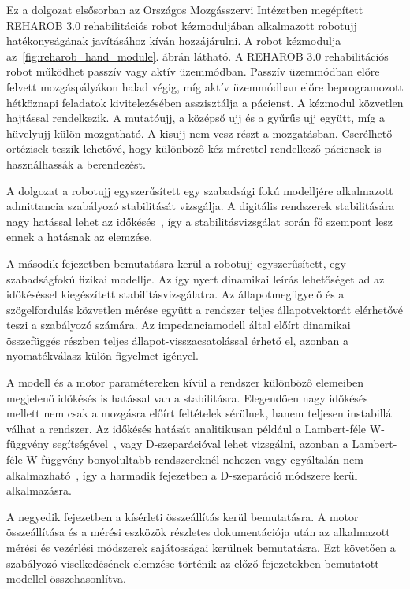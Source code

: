 Ez a dolgozat elsősorban az Országos Mozgásszervi Intézetben megépített REHAROB 3.0 
rehabilitációs robot kézmoduljában alkalmazott robotujj hatékonyságának javításához kíván hozzájárulni.
A robot kézmodulja az~\ref{fig:reharob_hand_module}. ábrán látható.
A REHAROB 3.0 rehabilitációs robot működhet passzív vagy aktív üzemmódban. Passzív üzemmódban előre felvett 
mozgáspályákon halad végig, míg aktív üzemmódban előre beprogramozott hétköznapi feladatok 
kivitelezésében asszisztálja a pácienst. A kézmodul közvetlen hajtással rendelkezik. A mutatóujj, a középső ujj és a
gyűrűs ujj együtt, míg a hüvelyujj külön mozgatható. A kisujj nem vesz részt a mozgatásban. Cserélhető ortézisek 
teszik lehetővé, hogy különböző kéz mérettel rendelkező páciensek is használhassák a berendezést.


A dolgozat a robotujj egyszerűsített egy szabadsági fokú modelljére alkalmazott admittancia szabályozó stabilitását vizsgálja.
A digitális rendszerek stabilitására nagy hatással lehet az időkésés~\citep{stepan1989retarded,stepan2001vibrations}, így a 
stabilitásvizsgálat során fő szempont lesz ennek a hatásnak az elemzése. 


A második fejezetben bemutatásra kerül a robotujj egyszerűsített, egy szabadságfokú fizikai modellje. 
Az így nyert dinamikai leírás lehetőséget ad az időkéséssel kiegészített stabilitásvizsgálatra.
Az állapotmegfigyelő és a szögelfordulás közvetlen mérése együtt a rendszer teljes állapotvektorát elérhetővé 
teszi a szabályozó számára.
Az impedanciamodell által előírt dinamikai összefüggés részben teljes állapot-visszacsatolással érhető el, 
azonban a nyomatékválasz külön figyelmet igényel.


A modell és a motor paramétereken kívül a rendszer különböző elemeiben megjelenő időkésés is hatással 
van a stabilitásra. Elegendően nagy időkésés mellett nem csak a mozgásra előírt feltételek sérülnek, 
hanem teljesen instabillá válhat a rendszer. Az időkésés hatását analitikusan például a Lambert-féle 
W-függvény segítségével~\citep{Yi2012, MatrixLambert2007}, vagy D-szeparációval lehet vizsgálni, azonban 
a Lambert-féle W-függvény bonyolultabb rendszereknél nehezen vagy egyáltalán nem alkalmazható~\citep{CepedaGomez2015}, 
így a harmadik fejezetben a D-szeparáció módszere kerül alkalmazásra.


A negyedik fejezetben a kísérleti összeállítás kerül bemutatásra. A motor összeállítása és a mérési 
eszközök részletes dokumentációja után az alkalmazott mérési és vezérlési módszerek sajátosságai kerülnek 
bemutatásra. Ezt követően a szabályozó viselkedésének elemzése történik az előző fejezetekben bemutatott 
modellel összehasonlítva.

    
    
